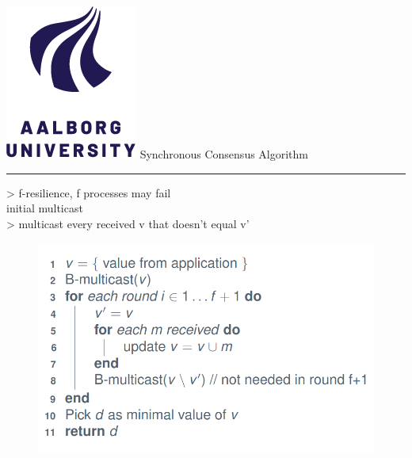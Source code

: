 \documentclass[aspectratio=1610,17pt,utf8]{beamer}
\newcommand{\regularframe}[1]{\color{black}\includegraphics[width=.05\textwidth]{figures/aau.png} #1\\\hrule}
\begin{document}
\begin{frame}{\regularframe{Synchronous Consensus Algorithm}}
    \begin{minipage}{.45\textwidth}
    > f-resilience, f processes may fail\\
    initial multicast\\
    > multicast every received v that doesn't equal v'
    \end{minipage}
    \begin{minipage}{.45\textwidth}
        \begin{figure}
            \includegraphics[width=\textwidth]{figures/sync_consensus.png}
        \end{figure}
    \end{minipage}
\end{frame}
\end{document}
